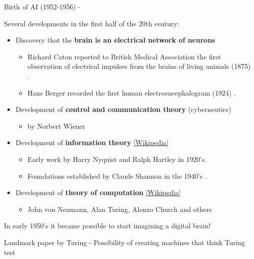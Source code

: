 \begin{frame}[t,allowframebreaks]{Birth of AI (1952-1956) -} 

Several developments in the first half of the 20th century:
\begin{itemize}
    \item Discovery that the {\bf brain is an electrical network of neurons}
    \begin{itemize}
        \item 
          Richard Caton reported to British Medical Association 
          the first observation of electrical impulses from the 
          brains of living animals (1875) \cite{Caton:1875}.
        \item 
          Hans Berger recorded the first human 
          electroencephalogram (1924) \cite{Berger:1929}.
    \end{itemize}
    \item 
    Development of {\bf control and communication theory} (cyberneutics) 
    \begin{itemize}
        \item by Norbert Wiener
    \end{itemize}
    \item 
    Development of {\bf information theory} 
    \href{https://en.wikipedia.org/wiki/Information_theory}{\tiny [Wikipedia]}
    \begin{itemize}
        \item Early work by Harry Nyquist and Ralph Hartley in 1920's.
        \item Foundations established by Claude Shannon in the 1940's \cite{Shannon:1948}.
    \end{itemize}
    \item 
    Development of {\bf theory of computation} 
    \href{https://en.wikipedia.org/wiki/Theory_of_computation}{\tiny [Wikipedia]}
    \begin{itemize}
        \item John von Neumann, Alan Turing, Alonzo Church and others
    \end{itemize}
\end{itemize}

In early 1950's it became possible to start imagining a digital brain!

\framebreak

Landmark paper by \gls{Turing}\cite{Turing:1950tt} - Possibility of creating machines that think
Turing test

\framebreak


\end{frame}
